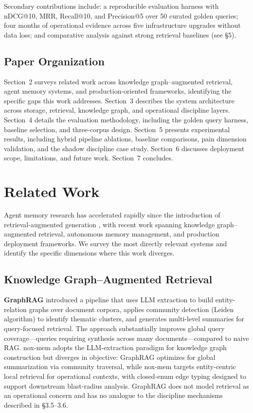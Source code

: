 \documentclass{article}
\begin{document}
Secondary contributions include: a reproducible evaluation harness with nDCG@10, MRR,
Recall@10, and Precision@5 over 50 curated golden queries; four months of operational
evidence across five infrastructure upgrades without data loss; and comparative analysis
against strong retrieval baselines (see \S5).

\subsection{Paper Organization}

Section~2 surveys related work across knowledge graph--augmented retrieval, agent memory
systems, and production-oriented frameworks, identifying the specific gaps this work
addresses. Section~3 describes the system architecture across storage, retrieval, knowledge
graph, and operational discipline layers. Section~4 details the evaluation methodology,
including the golden query harness, baseline selection, and three-corpus design. Section~5
presents experimental results, including hybrid pipeline ablations, baseline comparisons,
pain dimension validation, and the shadow discipline case study. Section~6 discusses
deployment scope, limitations, and future work. Section~7 concludes.

\section{Related Work}

Agent memory research has accelerated rapidly since the introduction of
retrieval-augmented generation \cite{lewis2020rag}, with recent work spanning knowledge
graph--augmented retrieval, autonomous memory management, and production deployment
frameworks. We survey the most directly relevant systems and identify the specific
dimensions where this work diverges.

\subsection{Knowledge Graph--Augmented Retrieval}

\textbf{GraphRAG} \cite{edge2024graphrag} introduced a pipeline that uses LLM extraction
to build entity-relation graphs over document corpora, applies community detection (Leiden
algorithm) to identify thematic clusters, and generates multi-level summaries for
query-focused retrieval. The approach substantially improves global query coverage---queries
requiring synthesis across many documents---compared to naive RAG. nox-mem adopts the
LLM-extraction paradigm for knowledge graph construction but diverges in objective:
GraphRAG optimizes for global summarization via community traversal, while nox-mem targets
entity-centric local retrieval for operational contexts, with closed-enum edge typing
designed to support downstream blast-radius analysis. GraphRAG does not model retrieval as
an operational concern and has no analogue to the discipline mechanisms described in
\S3.5--3.6.
\end{document}
